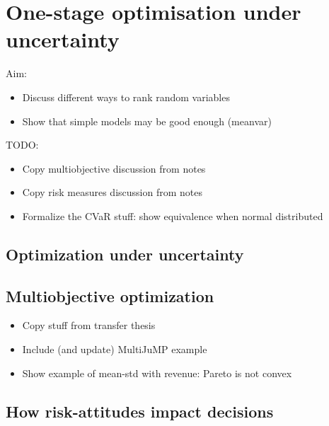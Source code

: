 \documentclass[main.tex]{subfiles}
\begin{document}
\chapter{One-stage optimisation under uncertainty}\label{ch:onestage}


Aim:
\begin{itemize}
\item Discuss different ways to rank random variables
\item Show that simple models may be good enough (meanvar)
\end{itemize}

TODO:
\begin{itemize}
\item Copy multiobjective discussion from notes
\item Copy risk measures discussion from notes
\item Formalize the CVaR stuff: show equivalence when normal distributed
\end{itemize}

\section{Optimization under uncertainty}


\section{Multiobjective optimization}
\begin{itemize}
\item Copy stuff from transfer thesis
\item Include (and update) MultiJuMP example
\item Show example of mean-std with revenue: Pareto is not convex
\end{itemize}

\section{How risk-attitudes impact decisions}

\biblio{} %
\end{document}
